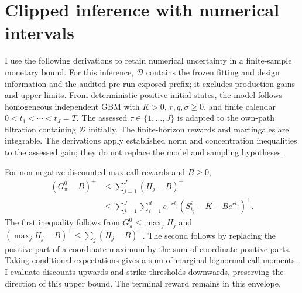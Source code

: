 \documentclass[11pt]{article}
\begin{document}
\section{Clipped inference with numerical intervals}
\label{app:interval-clipping}

I use the following derivations to retain numerical uncertainty in a finite-sample monetary bound. For this inference, $\mathcal D$ contains the frozen fitting and design information and the audited pre-run exposed prefix; it excludes production gains and upper limits. From deterministic positive initial states, the model follows homogeneous independent GBM with $K>0$, $r,q,\sigma\geq0$, and finite calendar $0<t_1<\cdots<t_J=T$. The assessed $\tau\in\{1,\ldots,J\}$ is adapted to the own-path filtration containing $\mathcal D$ initially. The finite-horizon rewards and martingales are integrable. The derivations apply established norm and concentration inequalities to the assessed gain; they do not replace the model and sampling hypotheses.

For non-negative discounted max-call rewards and $B\geq0$,
\begin{align}
 (G^0_\pi-B)^+
 &\leq \sum_{j=1}^J(H_j-B)^+\\
 &\leq \sum_{j=1}^J\sum_{i=1}^d e^{-rt_j}
       (S^i_{t_j}-K-Be^{rt_j})^+.
\label{eq:zero-tail-multivariate}
\end{align}
The first inequality follows from $G^0_\pi\leq\max_jH_j$ and $(\max_jH_j-B)^+\leq\sum_j(H_j-B)^+$. The second follows by replacing the positive part of a coordinate maximum by the sum of coordinate positive parts. Taking conditional expectations gives a sum of marginal lognormal call moments. I evaluate discounts upwards and strike thresholds downwards, preserving the direction of this upper bound. The terminal reward remains in this envelope.
\end{document}
